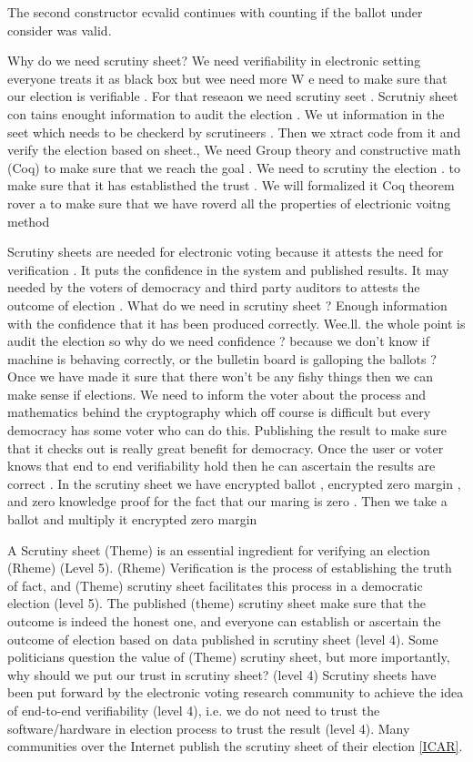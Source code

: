 The second constructor ecvalid continues with counting if the ballot under consider was valid. 








Why do we need scrutiny sheet? We need verifiability in electronic setting everyone treats 
it as black box but wee need more
W e need to make sure that our election is verifiable . For that reseaon we need scrutiny seet . Scrutniy sheet con
tains enought information to audit the election . We ut information in the seet which needs to be checkerd by 
scrutineers . Then we xtract code from it and verify the election based on sheet., 
We need Group theory and constructive math (Coq) to make sure that we reach the goal . We need to scrutiny 
the election . to make sure that it has establisthed the trust . We will formalized it Coq theorem rover a to make 
sure that we have roverd all the properties of electrionic voitng method 

Scrutiny sheets are needed for electronic voting because it attests the need for verification . It puts the confidence 
in the system and published results. It may needed by the voters of democracy and third party auditors to 
attests the outcome of election . What do we need in scrutiny sheet ? Enough information with the confidence
that it has been produced correctly. Wee.ll. the whole point is audit the election so why do we need 
confidence ? because we don't know if machine is behaving correctly, or the bulletin board is galloping
the ballots ? Once we have made it sure that there won't be any fishy things then we can make sense if 
elections. We need to inform the voter about the process and mathematics behind the cryptography 
which off course is difficult but every democracy has some voter who can do this. Publishing the result 
to make sure that it checks out is really great benefit for democracy. Once the user or voter knows that 
end to end verifiability hold then he can ascertain the results are correct . In the scrutiny sheet  
we have encrypted ballot , encrypted zero margin , and zero knowledge proof for the fact that 
our maring is zero . Then we take a ballot and multiply it encrypted zero margin 



A Scrutiny sheet (Theme) is an essential ingredient for verifying an election (Rheme) (Level 5). 
(Rheme) Verification 
is the process 
of establishing the truth of fact, and (Theme) scrutiny sheet facilitates this process in a democratic election 
(level 5). 
The published (theme) scrutiny sheet make sure that the outcome is indeed the honest one, and 
everyone can establish or ascertain the outcome of election based on data published in scrutiny
sheet (level 4). Some politicians question the value of (Theme) scrutiny sheet, but
more importantly, why should we put our trust in scrutiny sheet? (level 4) Scrutiny sheets have been put 
forward by the electronic voting research community to achieve the  
idea of end-to-end verifiability (level 4), i.e. we do not need to trust the 
software/hardware in election process to trust the result (level 4). 
Many communities over the Internet publish the scrutiny sheet of their 
election \ref{ICAR}.  


